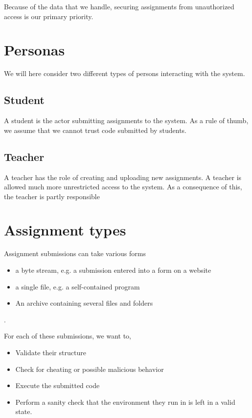 Because of the data that we handle, securing assignments from
unauthorized access is our primary priority.

\section{Personas}
We will here consider two different types of persons interacting with
the system.

\subsection{Student}
A student is the actor submitting assignments to the system. As a rule
of thumb, we assume that we cannot trust code submitted by students.

\subsection{Teacher}
A teacher has the role of creating and uploading new assignments. A
teacher is allowed much more unrestricted access to the system. As a
consequence of this, the teacher is partly responsible 

\section{Assignment types}
Assignment submissions can take various forms

\begin{itemize}
\item a byte stream, e.g. a submission entered into a form on a website
\item a single file, e.g. a self-contained program
\item An archive containing several files and folders
\end{itemize}.

For each of these submissions, we want to,

\begin{itemize}
\item Validate their structure
\item Check for cheating or possible malicious behavior
\item Execute the submitted code
\item Perform a sanity check that the environment they run in is left
  in a valid state.
\end{itemize}



